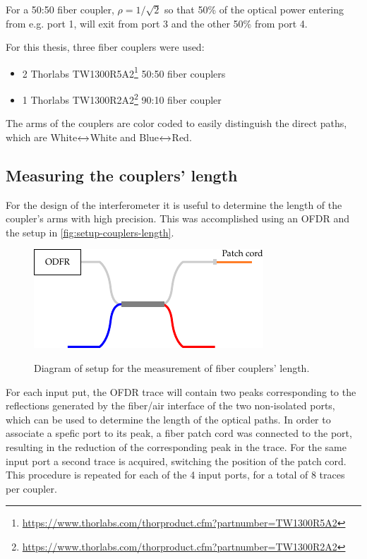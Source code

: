 For a 50:50 fiber coupler, $\rho = 1/\sqrt{2}$ so that 50\% of the optical power entering from e.g. port 1, will exit from port 3 and the other 50\% from port 4. 

For this thesis, three fiber couplers were used:
\begin{itemize}
	\item 2 Thorlabs TW1300R5A2\footnote{\url{https://www.thorlabs.com/thorproduct.cfm?partnumber=TW1300R5A2}} 50:50 fiber couplers
	\item 1 Thorlabs TW1300R2A2\footnote{\url{https://www.thorlabs.com/thorproduct.cfm?partnumber=TW1300R2A2}} 90:10 fiber coupler	
\end{itemize} 
The arms of the couplers are color coded to easily distinguish the direct paths, which are White$\xleftrightarrow{}$White and Blue$\xleftrightarrow{}$Red.

\subsection{Measuring the couplers' length}
For the design of the interferometer it is useful to determine the length of the coupler's arms with high precision. This was accomplished using an \acf{OFDR} and the setup in \autoref{fig:setup-couplers-length}. 


\begin{figure}[bth]
	\myfloatalign
	{\includegraphics[width=0.5\linewidth]{gfx/ch3/couplers/setup-misura-lunghezza.pdf}}
	\caption{Diagram of setup for the measurement of fiber couplers' length.}\label{fig:setup-couplers-length}
\end{figure}


For each input put, the \ac{OFDR} trace will contain two peaks corresponding to the reflections generated by the fiber/air interface of the two non-isolated ports, which can be used to determine the length of the optical paths. In order to associate a spefic port to its peak, a fiber patch cord was connected to the port, resulting in the reduction of the corresponding peak in the trace. For the same input port a second trace is acquired, switching the position of the patch cord. This procedure is repeated for each of the 4 input ports, for a total of $8$ traces per coupler. 

